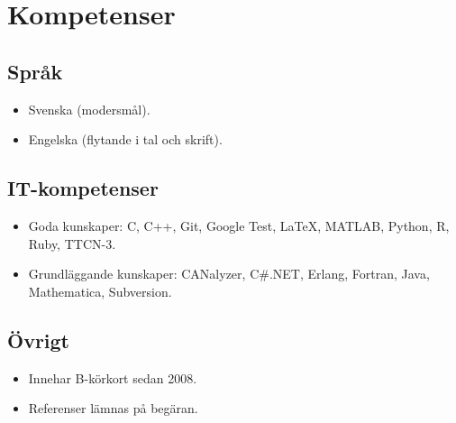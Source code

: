 \documentclass{skvitae}
\begin{document}
	\section{Kompetenser}
	\subsection{Språk}
	\begin{itemize}
		\item Svenska (modersmål).
		\item Engelska (flytande i tal och skrift).
	\end{itemize}

	\subsection{IT-kompetenser}
	\begin{itemize}
		\item Goda kunskaper: C, C++, Git, Google Test, \LaTeX, MATLAB, Python, R, Ruby, TTCN-3.
		\item Grundläggande kunskaper: CANalyzer, C\#.NET, Erlang, Fortran, Java, Mathematica, Subversion.
	\end{itemize}

	\subsection{Övrigt}
	\begin{itemize}
		\item Innehar B-körkort sedan 2008.
		\item Referenser lämnas på begäran.
	\end{itemize}
\end{document}
